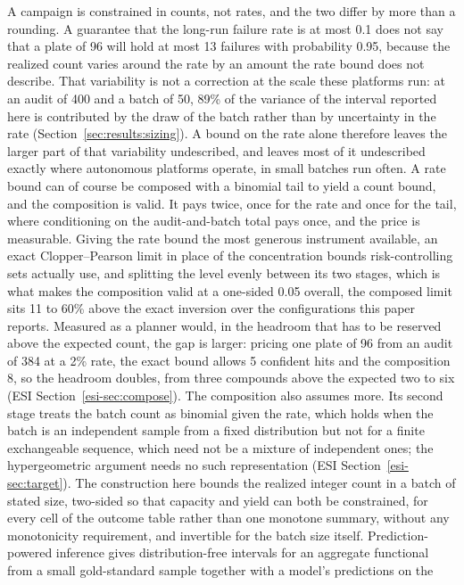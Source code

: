 \documentclass[twocolumn,10pt]{article}
\begin{document}
A campaign is constrained in counts, not rates, and the two differ by more than a rounding. A
guarantee that the long-run failure rate is at most 0.1 does not say that a plate of 96 will
hold at most 13 failures with probability 0.95, because the realized count varies around the
rate by an amount the rate bound does not describe. That variability is not a correction at the
scale these platforms run: at an audit of 400 and a batch of 50, 89\% of the variance of the
interval reported here is contributed by the draw of the batch rather than by uncertainty in the
rate (Section~\ref{sec:results:sizing}). A bound on the rate alone therefore leaves the
larger part of that variability undescribed, and leaves most of it undescribed exactly where
autonomous platforms operate, in small batches run often. A rate bound can of course be composed with a
binomial tail to yield a count bound, and the composition is valid. It pays twice, once for the
rate and once for the tail, where conditioning on the audit-and-batch total pays once, and the
price is measurable. Giving the rate bound the most generous instrument available, an exact Clopper--Pearson limit in place of the concentration bounds risk-controlling sets actually use, and splitting the level evenly between its two stages, which is what makes the composition
valid at a one-sided 0.05 overall, the composed limit sits 11 to 60\% above the exact inversion
over the configurations this paper reports. Measured as a planner would, in the headroom that
has to be reserved above the expected count, the gap is larger: pricing one plate of 96 from an
audit of 384 at a 2\% rate, the exact bound allows 5 confident hits and the composition 8, so
the headroom doubles, from three compounds above the expected two to six
(ESI Section~\ref{esi-sec:compose}). The composition also assumes more. Its second stage treats the batch count as binomial given the
rate, which holds when the batch is an independent sample from a fixed distribution but not for
a finite exchangeable sequence, which need not be a mixture of independent
ones;\citep{DiaconisFreedman1980} the hypergeometric argument needs no such representation
(ESI Section~\ref{esi-sec:target}). The construction here bounds the realized integer count in
a batch of stated size, two-sided so that capacity and yield can both be constrained, for every
cell of the outcome table rather than one monotone summary, without any monotonicity
requirement, and invertible for the batch size itself. Prediction-powered inference gives distribution-free intervals for an aggregate functional
from a small gold-standard sample together with a model's predictions on the
\end{document}

